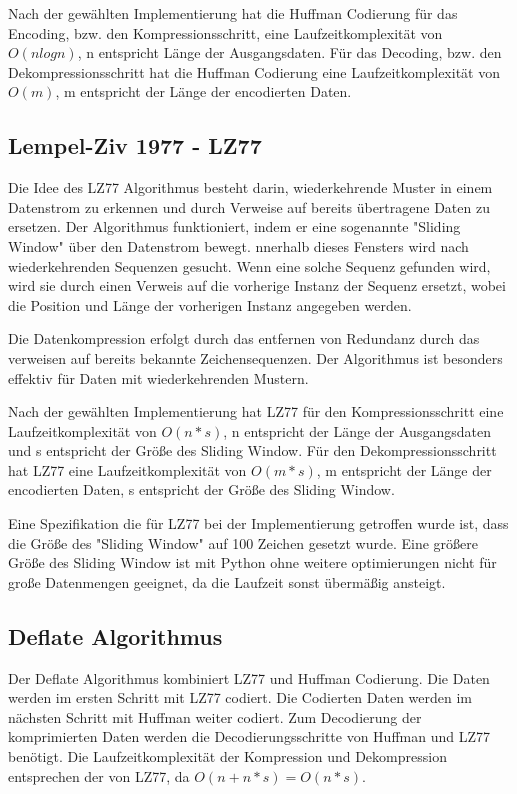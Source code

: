 \documentclass[conference]{IEEEtran}
\begin{document}
Nach der gewählten Implementierung hat
die Huffman Codierung für das Encoding, bzw. den Kompressionsschritt, eine 
Laufzeitkomplexität von $O(n log n)$, n entspricht Länge der Ausgangsdaten. 
Für das Decoding, bzw. den Dekompressionsschritt hat die Huffman Codierung eine 
Laufzeitkomplexität von $O(m)$, m entspricht der Länge der encodierten Daten. \cite{moffat} 

\subsection{Lempel-Ziv 1977 - LZ77}

Die Idee des LZ77 Algorithmus besteht darin, wiederkehrende Muster 
in einem Datenstrom zu erkennen und durch Verweise auf bereits übertragene Daten zu ersetzen.
Der Algorithmus funktioniert, indem er eine sogenannte "Sliding Window" über den 
Datenstrom bewegt.
nnerhalb dieses Fensters wird nach wiederkehrenden Sequenzen gesucht. 
Wenn eine solche Sequenz gefunden wird, wird sie durch einen Verweis auf die 
vorherige Instanz der Sequenz ersetzt, wobei die Position und Länge der vorherigen Instanz 
angegeben werden.

Die Datenkompression erfolgt durch das entfernen von Redundanz durch das verweisen auf bereits 
bekannte Zeichensequenzen.
Der Algorithmus ist besonders effektiv für Daten mit wiederkehrenden Mustern.

Nach der gewählten Implementierung hat
LZ77 für den Kompressionsschritt eine Laufzeitkomplexität von 
$O(n * s)$, n entspricht der Länge der Ausgangsdaten und s entspricht der
Größe des Sliding Window. 
Für den Dekompressionsschritt hat LZ77 eine 
Laufzeitkomplexität von $O(m * s)$, m entspricht der Länge der encodierten Daten, s entspricht der
Größe des Sliding Window. \cite{nick} 

Eine Spezifikation die für LZ77 bei der Implementierung getroffen wurde ist, 
dass die Größe des "Sliding Window" auf 100 Zeichen gesetzt wurde.
Eine größere Größe des Sliding Window ist mit Python ohne 
weitere optimierungen nicht für große Datenmengen geeignet, da die Laufzeit 
sonst übermäßig ansteigt.

\subsection{Deflate Algorithmus}

Der Deflate Algorithmus kombiniert LZ77 und Huffman Codierung.
Die Daten werden im ersten Schritt mit LZ77 codiert.
Die Codierten Daten werden im nächsten Schritt mit Huffman weiter codiert.
Zum Decodierung der komprimierten Daten werden die Decodierungsschritte von Huffman 
und LZ77 benötigt. 
Die Laufzeitkomplexität der Kompression und Dekompression entsprechen der von 
LZ77, da $O(n + n * s) = O(n * s)$.
\end{document}
